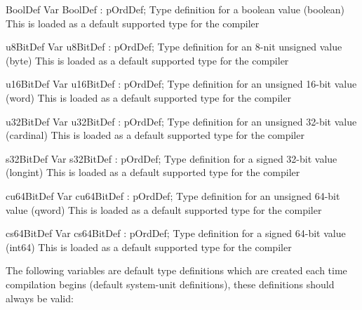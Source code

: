 \documentclass [a4paper,12pt]{article}
\begin{document}
\begin{variable}{BoolDef}
\Declaration
Var BoolDef : pOrdDef;
\Description
Type definition for a boolean value (\textsf{boolean})
\Notes
This is loaded as a default supported type for the compiler
\end{variable}

\begin{variable}{u8BitDef}
\Declaration
Var u8BitDef : pOrdDef;
\Description
Type definition for an 8-nit unsigned value (\textsf{byte})
\Notes
This is loaded as a default supported type for the compiler
\end{variable}

\begin{variable}{u16BitDef}
\Declaration
Var u16BitDef : pOrdDef;
\Description
Type definition for an unsigned 16-bit value (\textsf{word})
\Notes
This is loaded as a default supported type for the compiler
\end{variable}

\begin{variable}{u32BitDef}
\Declaration
Var u32BitDef : pOrdDef;
\Description
Type definition for an unsigned 32-bit value (\textsf{cardinal})
\Notes
This is loaded as a default supported type for the compiler
\end{variable}

\begin{variable}{s32BitDef}
\Declaration
Var s32BitDef : pOrdDef;
\Description
Type definition for a signed 32-bit value (\textsf{longint})
\Notes
This is loaded as a default supported type for the compiler
\end{variable}

\begin{variable}{cu64BitDef}
\Declaration
Var cu64BitDef : pOrdDef;
\Description
Type definition for an unsigned 64-bit value (\textsf{qword})
\Notes
This is loaded as a default supported type for the compiler
\end{variable}

\begin{variable}{cs64BitDef}
\Declaration
Var cs64BitDef : pOrdDef;
\Description
Type definition for a signed 64-bit value (\textsf{int64})
\Notes
This is loaded as a default supported type for the compiler
\end{variable}

The following variables are default type definitions which are created each
time compilation begins (default system-unit definitions), these definitions
should always be valid:
\end{document}
